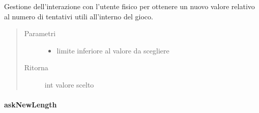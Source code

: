 \documentclass[letterpaper,10pt,italian,openany,oneside]{sphinxmanual}
\begin{document}
\begin{fulllineitems}
\label{\detokenize{source/it/unicam/cs/pa/mastermind/ui/StartView:it.unicam.cs.pa.mastermind.ui.StartView.askNewAttempts(int)}}
Gestione dell’interazione con l’utente fisico per ottenere un nuovo valore relativo al numero di tentativi utili all’interno del gioco.
\begin{quote}\begin{description}
\item[{Parametri}] \leavevmode\begin{itemize}
\item {} 
 \textendash{} limite inferiore al valore da scegliere

\end{itemize}

\item[{Ritorna}] \leavevmode
int valore scelto

\end{description}\end{quote}

\end{fulllineitems}



\paragraph{askNewLength}
\label{\detokenize{source/it/unicam/cs/pa/mastermind/ui/StartView:asknewlength}}
\end{document}
